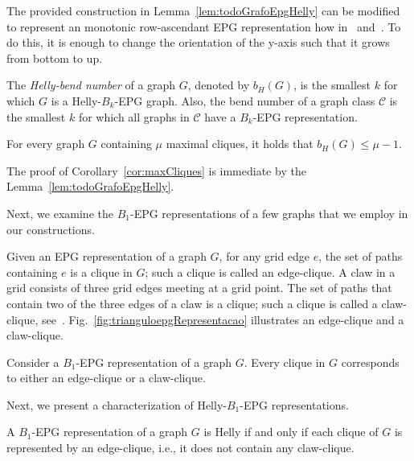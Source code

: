  


 The provided construction in Lemma~\ref{lem:todoGrafoEpgHelly} can be modified to represent an monotonic row-ascendant EPG representation how in~\cite{golumbic2009} and~\cite{golumbic2013}. To do this, it is enough to change the orientation of the y-axis such that it grows from bottom to up.


\begin{definition}
The \emph{Helly-bend number} of a graph $G$, denoted by $b_H(G)$, is the smallest $k$ for which $G$ is a Helly-$B_k$-EPG graph. Also, the bend number of a graph class ${\mathcal C}$ is the smallest $k$ for which all graphs in ${\mathcal C}$ have a $B_k$-EPG representation.
\end{definition}
 
\begin{corollary}\label{cor:maxCliques}
For every graph $G$ containing $\mu$ maximal cliques, it holds that $b_H(G)\leq \mu -1$. 
\end{corollary}


The proof of Corollary~\ref{cor:maxCliques}  is immediate by the Lemma~\ref{lem:todoGrafoEpgHelly}.

Next, we examine the $B_1$-EPG representations of a few graphs that we employ in our constructions.

\medskip

Given an EPG representation of a graph $G$, for any grid edge $e$, the set of paths containing $e$ is a clique in $G$; such a clique is called an edge-clique. A claw in a grid consists of three grid edges meeting at a grid point. The set of paths that contain two of the three edges of a claw is a clique; such a clique is called a claw-clique, see~\cite{golumbic2009}. Fig.~\ref{fig:trianguloepgRepresentacao} illustrates an edge-clique and a claw-clique.

\begin{lemma}\label{edge-claw-clique} 
Consider a $B_1$-EPG representation of a graph $G$. Every clique in $G$ corresponds to either an edge-clique or a claw-clique.
\end{lemma}

Next, we present a characterization of Helly-$B_1$-EPG representations.

\begin{lemma}\label{caracterization}
A $B_1$-EPG representation of a graph $G$ is Helly if and only if each clique of $G$ is represented by an edge-clique, i.e., it does not contain any claw-clique.
\end{lemma}

